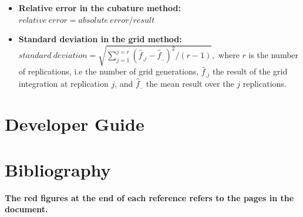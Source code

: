 \documentclass[a4paper,twoside,openright]{report}
\begin{document}
\begin{itemize}
\item\textbf{\hypertarget{reler}{Relative error} in the cubature method:}
\newline
$relative\ error = absolute\ error / result$




\item\textbf{\hypertarget{gridet}{Standard deviation}  in the grid method:}
\newline
$standard\ deviation =
\sqrt{\sum_{j=1}^{j=r}(\hat{f}_{.j}-\hat{f}_{..})^2 /(r-1)},$
where
$r$ is the number of replications, i.e
the number of grid generations,
$\hat{f}_{.j}$ the result of the grid integration at  replication $j$,
and $\hat{f}_{..}$ the  mean  result over the $j$ replications.

\end{itemize}


\part{Developer Guide}


%

\part{Bibliography}




\textbf{
The red figures at the end of each reference refers to the pages
in the document.}
\end{document}
